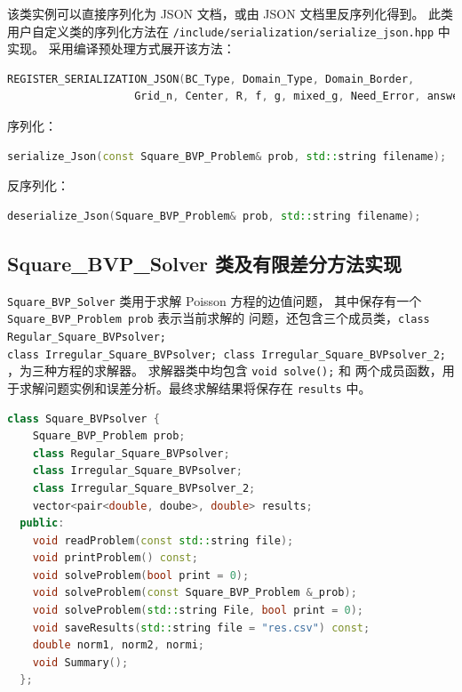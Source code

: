 \documentclass[lang=cn,a4paper,newtx,bibend=bibtex]{elegantpaper}
\begin{document}
该类实例可以直接序列化为 JSON 文档，或由 JSON 文档里反序列化得到。
此类用户自定义类的序列化方法在 \texttt{/include/serialization/serialize\_json.hpp} 中实现。
采用编译预处理方式展开该方法：

\begin{lstlisting}[language = C++]
  REGISTER_SERIALIZATION_JSON(BC_Type, Domain_Type, Domain_Border, 
                    Grid_n, Center, R, f, g, mixed_g, Need_Error, answer);
\end{lstlisting}

序列化：

\begin{lstlisting}[language = C++]
  serialize_Json(const Square_BVP_Problem& prob, std::string filename);
\end{lstlisting}

反序列化：

\begin{lstlisting}[language = C++]
  deserialize_Json(Square_BVP_Problem& prob, std::string filename);
\end{lstlisting}

\subsection{Square\_BVP\_Solver 类及有限差分方法实现}

\texttt{Square\_BVP\_Solver} 类用于求解 Poisson 方程的边值问题，
其中保存有一个 \texttt{Square\_BVP\_Problem prob} 表示当前求解的
问题，还包含三个成员类，\texttt{class Regular\_Square\_BVPsolver;\\
class Irregular\_Square\_BVPsolver;
class Irregular\_Square\_BVPsolver\_2;} ，为三种方程的求解器。
求解器类中均包含 \texttt{void solve();} 和 
两个成员函数，用于求解问题实例和误差分析。最终求解结果将保存在 \lstinline{results} 中。

\begin{lstlisting}[language = C++]
  class Square_BVPsolver {
    Square_BVP_Problem prob;
    class Regular_Square_BVPsolver;
    class Irregular_Square_BVPsolver;
    class Irregular_Square_BVPsolver_2;
    vector<pair<double, doube>, double> results;
  public:
    void readProblem(const std::string file);
    void printProblem() const;
    void solveProblem(bool print = 0);
    void solveProblem(const Square_BVP_Problem &_prob);
    void solveProblem(std::string File, bool print = 0);
    void saveResults(std::string file = "res.csv") const;
    double norm1, norm2, normi;
    void Summary();
  };
\end{lstlisting}
\end{document}
